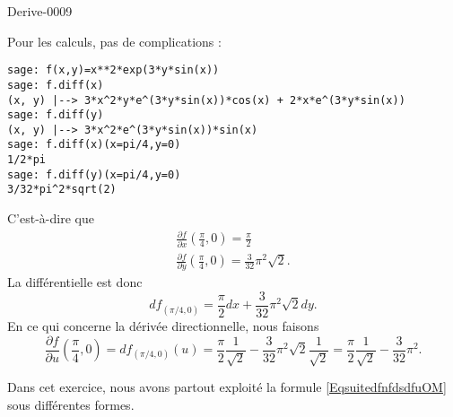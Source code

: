 
\begin{corrige}{Derive-0009}

    Pour les calculs, pas de complications :
    \begin{verbatim}
sage: f(x,y)=x**2*exp(3*y*sin(x))
sage: f.diff(x)            
(x, y) |--> 3*x^2*y*e^(3*y*sin(x))*cos(x) + 2*x*e^(3*y*sin(x))
sage: f.diff(y)
(x, y) |--> 3*x^2*e^(3*y*sin(x))*sin(x)
sage: f.diff(x)(x=pi/4,y=0)
1/2*pi
sage: f.diff(y)(x=pi/4,y=0)
3/32*pi^2*sqrt(2)
    \end{verbatim}
    C'est-à-dire que
    \begin{subequations}
        \begin{align}
            \frac{ \partial f }{ \partial x }(\frac{ \pi }{ 4 },0)=\frac{ \pi }{ 2 }\\
            \frac{ \partial f }{ \partial y } (\frac{ \pi }{ 4 },0)=\frac{ 3 }{ 32 }\pi^2\sqrt{2}.
        \end{align}
    \end{subequations}
    La différentielle est donc
    \begin{equation}
        df_{(\pi/4,0)}=\frac{ \pi }{ 2 }dx+\frac{ 3 }{ 32 }\pi^2\sqrt{2}dy.
    \end{equation}
    En ce qui concerne la dérivée directionnelle, nous faisons
    \begin{equation}
        \frac{ \partial f }{ \partial u }(\frac{ \pi }{ 4 },0)=df_{(\pi/4,0)}(u)=\frac{ \pi }{2}\frac{1}{ \sqrt{2} }-\frac{ 3 }{ 32 }\pi^2\sqrt{2}\frac{1}{ \sqrt{2} }=\frac{ \pi }{2}\frac{1}{ \sqrt{2} }-\frac{ 3 }{ 32 }\pi^2.
    \end{equation}

    Dans cet exercice, nous avons partout exploité la formule \eqref{EqsuitedfnfdsdfuOM} sous différentes formes.
\end{corrige}

